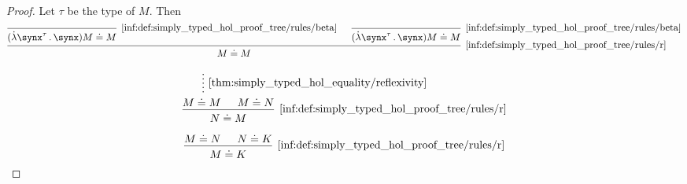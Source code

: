 \begin{proof}
   Let \( \tau \) be the type of \( M \). Then
  \begin{equation*}
    \begin{prooftree}
      \infer0[\ref{inf:def:simply_typed_hol_proof_tree/rules/beta}]{ (\qabs {\synx^\tau} \synx) M \syneq M }
      \infer0[\ref{inf:def:simply_typed_hol_proof_tree/rules/beta}]{ (\qabs {\synx^\tau} \synx) M \syneq M }
      \infer2[\ref{inf:def:simply_typed_hol_proof_tree/rules/r}]{ M \syneq M }
    \end{prooftree}
  \end{equation*}

  \begin{equation*}
    \begin{prooftree}
      \hypo{}
      \ellipsis { \ref{thm:simply_typed_hol_equality/reflexivity} } { M \syneq M }

      \hypo{ M \syneq N }

      \infer2[\ref{inf:def:simply_typed_hol_proof_tree/rules/r}]{ N \syneq M }
    \end{prooftree}
  \end{equation*}

  \begin{equation*}
    \begin{prooftree}
      \hypo{ M \syneq N }
      \hypo{ N \syneq K }
      \infer2[\ref{inf:def:simply_typed_hol_proof_tree/rules/r}]{ M \syneq K }
    \end{prooftree}
  \end{equation*}
\end{proof}

